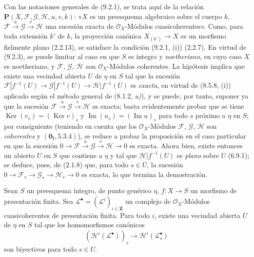 Con las notaciones generales de (9.2.1), se trata aquí de la relación
$\boldsymbol{P}(X,\mathcal F,\mathcal G,\mathcal H,u,v,k)$: «$X$ es un
preesquema algebraico sobre el cuerpo $k$,
$\mathcal F\xrightarrow{u}\mathcal G\xrightarrow{v}\mathcal H$ una sucesión
exacta de $\mathcal O_X$-Módulos cuasicoherentes». Como, para toda extensión
$k'$ de $k$, la proyección canónica $X_{(k')}\to X$ es un morfismo
fielmente plano (2.2.13), se satisface la condición (9.2.1, (i)) (2.2.7). En
virtud de (9.2.3), se puede limitar al caso en que $S$ es íntegro y
\emph{noetheriano}, en cuyo caso $X$ es noetheriano, y $\mathcal F$,
$\mathcal G$, $\mathcal H$ son $\mathcal O_X$-Módulos coherentes.
La hipótesis implica que existe una vecindad abierta $U$ de $\eta$ en $S$
tal que la sucesión
$\mathcal F|f^{-1}(U)\to\mathcal G|f^{-1}(U)\to\mathcal H|f^{-1}(U)$ es
\emph{exacta}, en virtud de (8.5.8, (i)) aplicado según el método general
de (8.1.2, \emph{a)}), y se puede, por tanto, suponer ya que la sucesión
$\mathcal F\xrightarrow{u}\mathcal G\xrightarrow{v}\mathcal H$ es exacta;
basta evidentemente probar que se tiene
$\operatorname{Ker}(v_s)=(\operatorname{Ker}v)_s$ y
$\operatorname{Im}(u_s)=(\operatorname{Im}u)_s$ para todo $s$ próximo a
$\eta$ en $S$; por consiguiente (teniendo en cuenta que los
$\mathcal O_X$-Módulos $\mathcal F$, $\mathcal G$, $\mathcal H$ son
\emph{coherentes} y $(\mathbf 0_{\mathrm I},5.3.4)$), se reduce a
probar la proposición en el caso particular en que la sucesión
$0\to\mathcal F\xrightarrow{u}\mathcal G\xrightarrow{v}\mathcal H\to0$
es exacta. Ahora bien, existe entonces un abierto $U$ en $S$ que contiene a $\eta$ y tal
que $\mathcal H|f^{-1}(U)$ es \emph{plano} sobre $U$ (6.9.1); se deduce, pues,
de (2.1.8) que, para todo $s\in U$, la sucesión
$0\to\mathcal F_s\to\mathcal G_s\to\mathcal H_s\to0$ es exacta, lo que
termina la demostración.

\begin{corollary}[9.4.3]
\label{IV.9.4.3}
Sean $S$ un preesquema íntegro, de punto genérico $\eta$, $f:X\to S$ un
morfismo de presentación finita. Sea
$\mathcal L^\bullet=(\mathcal L^i)_{i\in\mathbf Z}$ un complejo de
$\mathcal O_X$-Módulos cuasicoherentes de presentación finita. Para todo $i$,
existe una vecindad abierta $U$ de $\eta$ en $S$ tal que los homomorfismos
canónicos
\begin{equation}
\label{IV.9.4.3.1-fr}
(\mathcal H^i(\mathcal L^\bullet))_s\to
\mathcal H^i(\mathcal L_s^\bullet) \tag{9.4.3.1}
\end{equation}
son biyectivos para todo $s\in U$.
\end{corollary}

